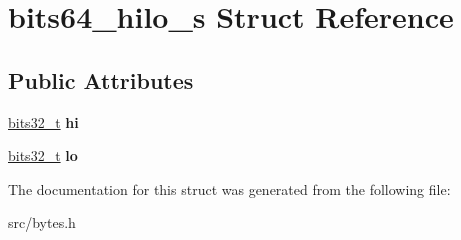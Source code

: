 \hypertarget{structbits64__hilo__s}{}\section{bits64\+\_\+hilo\+\_\+s Struct Reference}
\label{structbits64__hilo__s}
\subsection*{Public Attributes}
\begin{DoxyCompactItemize}
\item 
\hyperlink{unionbits32__t}{bits32\+\_\+t} {\bfseries hi}\hypertarget{structbits64__hilo__s_a0946ebf0589c70719d27a2e48483857b}{}\label{structbits64__hilo__s_a0946ebf0589c70719d27a2e48483857b}

\item 
\hyperlink{unionbits32__t}{bits32\+\_\+t} {\bfseries lo}\hypertarget{structbits64__hilo__s_a2aeab9be01dab5f21c7a461d25bd2ab1}{}\label{structbits64__hilo__s_a2aeab9be01dab5f21c7a461d25bd2ab1}

\end{DoxyCompactItemize}


The documentation for this struct was generated from the following file\+:\begin{DoxyCompactItemize}
\item 
src/bytes.\+h\end{DoxyCompactItemize}
